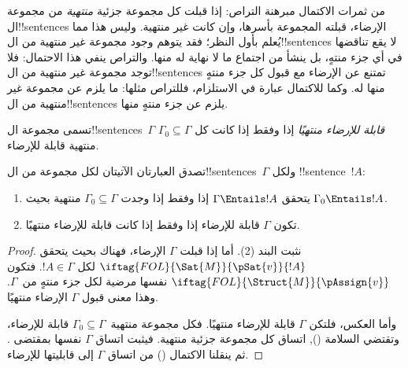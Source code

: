\documentclass[../../../include/open-logic-section]{subfiles}
\begin{document}
      {}
      {}


من ثمرات الاكتمال مبرهنة التراص: إذا قبلت كل مجموعة جزئية
\emph{منتهية} من مجموعة ال!!{sentence}s الإرضاء، قبلته المجموعة
بأسرها، وإن كانت غير منتهية. وليس هذا مما يُعلم بأول النظر؛ فقد يتوهم
وجود مجموعة غير منتهية من ال!!{sentence}s لا يقع تناقضها في أي جزء
منتهٍ، بل ينشأ من اجتماع ما لا نهاية له منها. والتراص ينفي هذا
الاحتمال: فلا توجد مجموعة غير منتهية من ال!!{sentence}s تمتنع عن
الإرضاء مع قبول كل جزء منتهٍ منها له. وكما للاكتمال عبارة في
الاستلزام، فللتراص مثلها: ما يلزم عن مجموعة غير منتهية من
ال!!{sentence}s يلزم عن جزء منتهٍ منها.

\begin{defn}
  تسمى مجموعة ال!!{sentence}s~$\Gamma$ \emph{قابلة للإرضاء منتهيًا} إذا
  وفقط إذا كانت كل $\Gamma_0 \subseteq \Gamma$ منتهية قابلة للإرضاء.
\end{defn}

\begin{thm}
تصدق العبارتان الآتيتان لكل مجموعة من ال!!{sentence}s~$\Gamma$ ولكل
!!{sentence}~$!A$:
\begin{enumerate}
  \item يتحقق $\Gamma \Entails !A$ إذا وفقط إذا وجدت
    $\Gamma_0 \subseteq \Gamma$ منتهية بحيث $\Gamma_0 \Entails !A$.
  \item تكون $\Gamma$ قابلة للإرضاء إذا وفقط إذا كانت قابلة للإرضاء
    منتهيًا.
\end{enumerate}
\end{thm}

\begin{proof}
نثبت البند (2). أما إذا قبلت $\Gamma$ الإرضاء، فهناك
بحيث يتحقق $\iftag{FOL}{\Sat{M}}{\pSat{v}}{!A}$ لكل $!A \in
\Gamma$. فتكون $\iftag{FOL}{\Struct{M}}{\pAssign{v}}$ نفسها مرضية لكل
جزء منتهٍ من~$\Gamma$. وهذا معنى قبول $\Gamma$ الإرضاء منتهيًا.

وأما العكس، فلتكن $\Gamma$ قابلة للإرضاء منتهيًا. فكل
مجموعة منتهية~$\Gamma_0 \subseteq \Gamma$ قابلة للإرضاء، وتقتضي السلامة
(),
اتساق كل مجموعة جزئية منتهية. فيثبت اتساق $\Gamma$ نفسها بمقتضى
.
ثم ينقلنا الاكتمال () من اتساق $\Gamma$
إلى قابليتها للإرضاء.
\end{proof}
\end{document}
